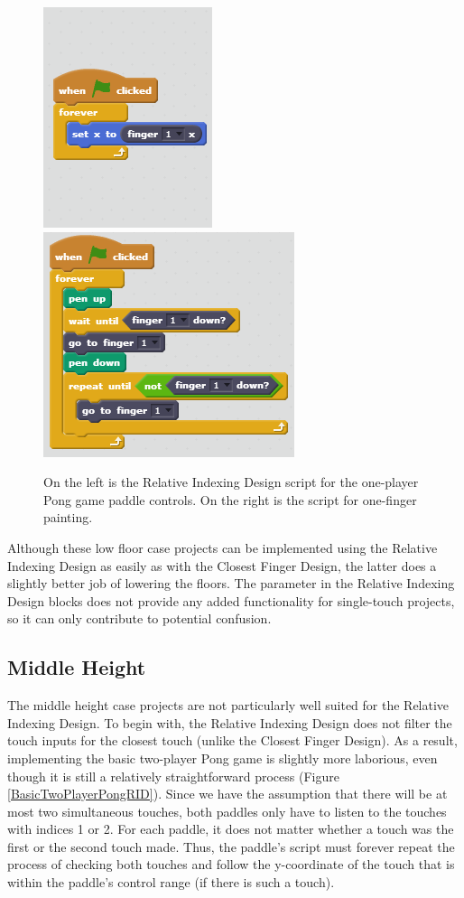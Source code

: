 \begin{figure}
\centering
\includegraphics{images/OnePlayerPongRID.PNG}
\includegraphics{images/OneFingerPaintingRID.PNG}
\caption[Sample Relative Indexing Design Scripts for Low Floor Case Projects]{On the left is the Relative Indexing Design script for the one-player Pong game paddle controls.  On the right is the script for one-finger painting.}
\label{LowFloorRID}
\end{figure}

Although  these low floor case projects can be implemented using the Relative Indexing Design as easily as with the Closest Finger Design, the latter does a slightly better job of lowering the floors. The parameter in the Relative Indexing Design blocks does not provide any added functionality for single-touch projects, so it can only contribute to potential confusion.

\subsection{Middle Height}

The middle height case projects are not particularly well suited for the Relative Indexing Design. To begin with, the Relative Indexing Design does not filter the touch inputs for the closest touch (unlike the Closest Finger Design). As a result, implementing the basic two-player Pong game is slightly more laborious, even though it is still a relatively straightforward process (Figure \ref{BasicTwoPlayerPongRID}). Since we have the assumption that there will be at most two simultaneous touches, both paddles only have to listen to the touches with indices 1 or 2. For each paddle, it does not matter whether a touch was the first or the second touch made. Thus, the paddle's script must forever repeat the process of checking both touches and follow the y-coordinate of the touch that is within the paddle's control range (if there is such a touch).


